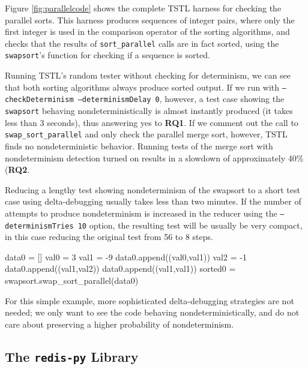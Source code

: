 Figure \ref{fig:parallelcode} shows the complete TSTL harness for
checking the parallel sorts.  This harness produces sequences of
integer pairs, where only the first integer is used in the comparison
operator of the sorting algorithms, and checks that the results of
{\tt sort\_parallel} calls are in fact sorted, using the {\tt
  swapsort}'s function for checking if a sequence is sorted.

Running TSTL's random tester without checking for determinism, we can
see that both sorting algorithms always produce sorted output.  If we run with {\tt --checkDeterminism --determinismDelay 0}, however, a
test case showing the {\tt swapsort} behaving nondeterministically is
almost instantly produced (it takes less than 3 seconds), thus
answering yes to {\bf  RQ1}.  If we comment out the call to {\tt
  swap\_sort\_parallel} and only check the parallel merge sort, however, TSTL
finds no nondeterministic behavior.  Running tests of the merge sort
with nondeterminism detection turned on results in a slowdown of approximately
40\% ({\bf RQ2}.

Reducing a lengthy test showing nondeterminism of the swapsort to a
short test case using delta-debugging usually takes less than two
minutes.  If the number of attempts to produce nondeterminism is
increased in the reducer using the {\tt --determinismTries 10} option,
the resulting test will be usually be very compact, in this case
reducing the original test from 56 to 8 steps.

{\scriptsize
\begin{code}
data0 = []    
val0 = 3      
val1 = -9    
data0.append((val0,val1)) 
val2 = -1                         
data0.append((val1,val2))
data0.append((val1,val1))  
sorted0 = swapsort.swap\_sort\_parallel(data0)      
\end{code}
}

For this simple example, more sophisticated delta-debugging strategies
are not needed; we only want to see the code behaving
nondeterministically, and do not care about preserving a higher probability of nondeterminism.

\subsection {The {\tt redis-py} Library}


